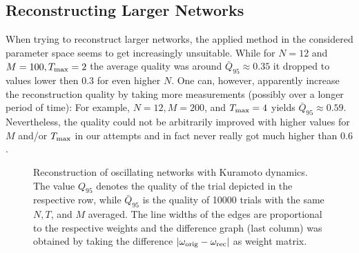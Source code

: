 \documentclass{scrartcl}
\begin{document}
\subsection{Reconstructing Larger Networks}
When trying to reconstruct larger networks, the applied method in the
considered parameter space seems to get increasingly unsuitable. While for
$N=12$ and  $M = 100, T_{\mathrm{max}} = 2$ the average quality was around
$\bar{Q}_{95}\approx 0.35$ it dropped to values lower then $0.3$ for even
higher $N$. One can, however, apparently increase the reconstruction
quality by taking more measurements (possibly over a longer period of
time): For example, $N=12, M=200$, and $T_{\mathrm{max}}=4$ yields
$\bar{Q}_{95}\approx 0.59$. Nevertheless, the quality could not be
arbitrarily improved with higher values for $M$ and/or $T_{\mathrm{max}}$ in our
attempts and in fact never really got much higher than $0.6$.  



\begin{figure}
    \centering
    \def\svgwidth{0.75\textwidth}
    
    \caption{Reconstruction of oscillating networks with Kuramoto dynamics. The
        value $Q_{95}$ denotes the quality of the trial depicted in the
        respective row, while $\bar{Q}_{95}$ is the quality of 10000
        trials with the same $N, T$, and $M$ averaged. The line widths of
        the edges are proportional to the respective weights and the
        difference graph (last column) was obtained by taking the
        difference $|\omega_{\mathrm{orig}} - \omega_{\mathrm{rec}}|$ as weight matrix.}
    \label{fig:D211}
\end{figure}



\end{document}

